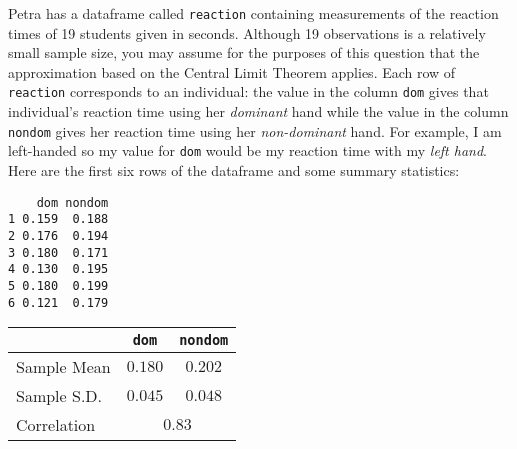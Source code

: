 \documentclass[addpoints,12pt]{exam}
\begin{document}
\begin{questions}
\question Petra has a dataframe called \texttt{reaction} containing measurements of the reaction times of 19 students given in seconds. Although 19 observations is a relatively small sample size, you may assume for the purposes of this question that the approximation based on the Central Limit Theorem applies. Each row of \texttt{reaction} corresponds to an individual: the value in the column \texttt{dom} gives that individual's reaction time using her \emph{dominant} hand while the value in the column \texttt{nondom} gives her reaction time using her \emph{non-dominant} hand. For example, I am left-handed so my value for \texttt{dom} would be my reaction time with my \emph{left hand}. Here are the first six rows of the dataframe and some summary statistics:
\begin{verbatim}
    dom nondom
1 0.159  0.188
2 0.176  0.194
3 0.180  0.171
4 0.130  0.195
5 0.180  0.199
6 0.121  0.179
\end{verbatim}
\begin{tabular}
	{l|cc}
	&\texttt{dom}&\texttt{nondom}\\
	\hline
	Sample Mean & $0.180$ & $0.202$\\
	Sample S.D. & $0.045$ & $0.048$ \\
	Correlation & \multicolumn{2}{c}{$0.83$} 
\end{tabular}

\vspace{2em}

\end{questions}
\end{document}
